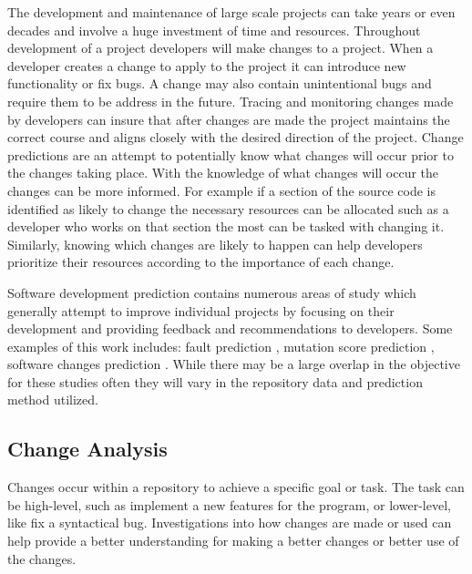 The development and maintenance of large scale projects can take years or even decades and involve a huge investment of time and resources. Throughout development of a project developers will make changes to a project. When a developer creates a change to apply to the project it can introduce new functionality or fix bugs. A change may also contain unintentional bugs and require them to be address in the future. Tracing and monitoring changes made by developers can insure that after changes are made the project maintains the correct course and aligns closely with the desired direction of the project. Change predictions are an attempt to potentially know what changes will occur prior to the changes taking place. With the knowledge of what changes will occur the changes can be more informed. For example if a section of the source code is identified as likely to change the necessary resources can be allocated such as a developer who works on that section the most can be tasked with changing it. Similarly, knowing which changes are likely to happen can help developers prioritize their resources according to the importance of each change.

Software development prediction contains numerous areas of study which generally attempt to improve individual projects by focusing on their development and providing feedback and recommendations to developers. Some examples of this work includes: fault prediction \cite{Nagappan2007, Moser2008, Thwin2005, Sisman2012}, mutation score prediction \cite{Jalbert2012}, software changes prediction \cite{Bantelay2013, Chaturvedi2014, Giger2012, Hassan2004, Kagdi2007, ying2004}. While there may be a large overlap in the objective for these studies often they will vary in the repository data and prediction method utilized.

\subsection{Change Analysis}

Changes occur within a repository to achieve a specific goal or task. The task can be high-level, such as implement a new features for the program, or lower-level, like fix a syntactical bug. Investigations into how changes are made or used can help provide a better understanding for making a better changes or better use of the changes.

